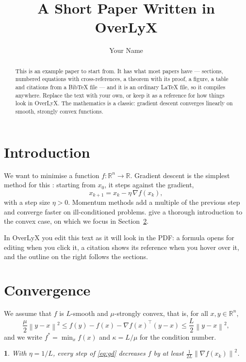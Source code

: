 \documentclass[11pt]{article}
\newcommand{\R}{\mathbb{R}}
\newcommand{\norm}[1]{\left\lVert #1\right\rVert}
\theoremstyle{plain}
\theoremstyle{plain}
\newtheorem{lem}[thm]{\protect\lemmaname}
\providecommand{\lemmaname}{Lemma}
\begin{document}
\title{A Short Paper Written in OverLyX}
\author{Your Name}
\maketitle
\begin{abstract}
This is an example paper to start from. It has what most papers have --- sections, numbered equations with cross-references, a theorem with its proof, a figure, a table and citations from a Bib\TeX{} file --- and it is an ordinary \LaTeX{} file, so it compiles anywhere. Replace the text with your own, or keep it as a reference for how things look in OverLyX. The mathematics is a classic: gradient descent converges linearly on smooth, strongly convex functions.
\end{abstract}

\section{Introduction}\label{sec:intro}

We want to minimise a function $f\colon\R^{n}\to\R$. Gradient descent is the simplest method for this \citep{nocedal2006numerical}: starting from $x_{0}$, it steps against the gradient,
\begin{equation}
x_{k+1}=x_{k}-\eta\,\nabla f(x_{k}),\label{eq:gd}
\end{equation}
with a step size $\eta>0$. Momentum methods \citep{polyak1964some,nesterov1983method} add a multiple of the previous step and converge faster on ill-conditioned problems. \citet{boyd2004convex} give a thorough introduction to the convex case, on which we focus in Section~\ref{sec:theory}.

In OverLyX you edit this text as it will look in the PDF: a formula opens for editing when you click it, a citation shows its reference when you hover over it, and the outline on the right follows the sections.

\section{Convergence}\label{sec:theory}

We assume that $f$ is $L$-smooth and $\mu$-strongly convex, that is, for all $x,y\in\R^{n}$,
\begin{equation}
\frac{\mu}{2}\norm{y-x}^{2}\le f(y)-f(x)-\nabla f(x)^{\top}(y-x)\le\frac{L}{2}\norm{y-x}^{2},\label{eq:assumptions}
\end{equation}
and we write $f^{\ast}=\min_{x}f(x)$ and $\kappa=L/\mu$ for the condition number.
\begin{lem}
\label{lem:descent} With $\eta=1/L$, every step of \eqref{eq:gd} decreases $f$ by at least $\frac{1}{2L}\norm{\nabla f(x_{k})}^{2}$.
\end{lem}
\end{document}
